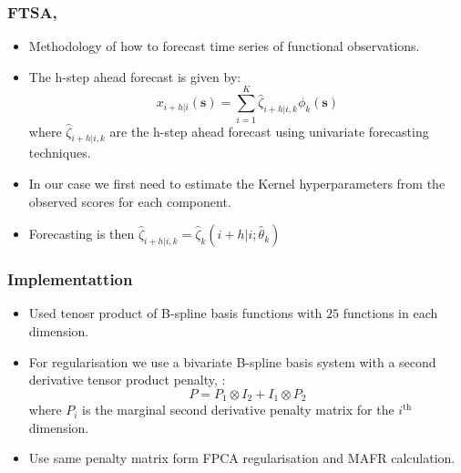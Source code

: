 \documentclass[aspectratio=169]{beamer}
\newcommand{\ve}[1]{\bm{{#1}}}
\begin{document}
  \begin{frame}
    \frametitle{FTSA, \cite{shang_ftsa_2013}}
    \begin{itemize}
      \item Methodology of how to forecast time series of functional observations.
      \item The h-step ahead forecast is given by:
        \begin{equation}
          x_{i+h | i} (\ve{s}) = \sum_{i=1}^{K} \hat{\zeta}_{i+h|i, k} \phi_k(\ve{s})
          \label{eqn:score_for}
        \end{equation}
        where $\hat{\zeta}_{i+h | i, k}$ are the h-step ahead forecast using univariate forecasting techniques. 
      \item In our case we first need to estimate the Kernel hyperparameters from the observed scores for each component. 
      \item Forecasting is then $\hat{\zeta}_{i+h | i, k} = \hat{\zeta}_k(i+h | i; \hat{\theta}_k)$ 
    \end{itemize}
  \end{frame}

  \begin{frame}
    \frametitle{Implementattion}
    \begin{itemize}
      \item Used tenosr product of B-spline basis functions with $25$ functions in each dimension.
      \item For regularisation we use a bivariate B-spline basis system with a second derivative tensor product penalty, \cite{wood_low-rank_2006}:
        \begin{equation}
          P = P_1 \otimes I_2 + I_1 \otimes P_2 
          \label{eqn:reg}
        \end{equation}
        where $P_i$ is the marginal second derivative penalty matrix for the $i^\text{th}$ dimension.
      \item Use same penalty matrix form FPCA regularisation and MAFR calculation.   
    \end{itemize}
  \end{frame}
  
\end{document}
